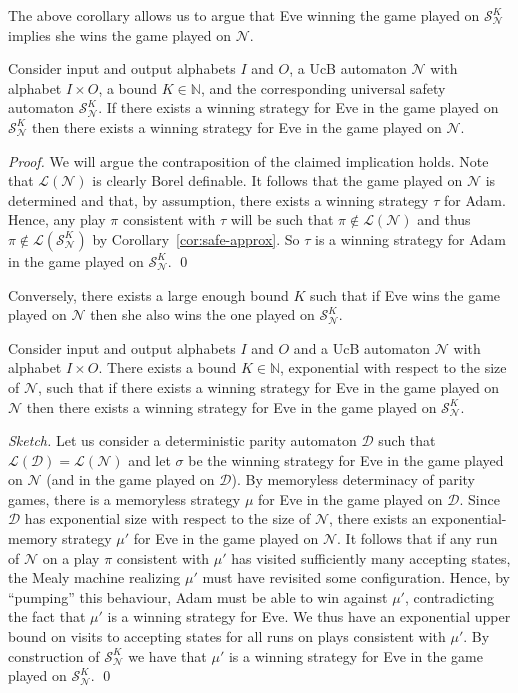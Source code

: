 \documentclass[runningheads,a4paper,draft]{llncs}
\newcommand{\eve}{Eve\xspace}
\newcommand{\adam}{Adam\xspace}
\newcommand{\calN}{\mathcal{N}}
\newcommand{\calS}{\mathcal{S}}
\newcommand{\calD}{\mathcal{D}}
\newcommand{\lang}[1]{\mathcal{L}({#1})}
\begin{document}
The above corollary allows us to argue that \eve winning the game played on
$\calS^K_\calN$ implies she wins the game played on $\calN$.
\begin{lemma}
    Consider input and output alphabets $I$ and $O$, a UcB
    automaton $\calN$ with alphabet $I \times O$, a bound $K \in \mathbb{N}$,
    and the corresponding universal safety automaton $\calS^K_\calN$. If there
    exists a winning strategy for \eve in the game played on $\calS^K_\calN$
    then there exists a winning strategy for \eve in the game played on
    $\calN$.
\end{lemma}
\begin{proof}
    We will argue the contraposition of the claimed implication holds.
    Note that $\lang{\calN}$ is clearly Borel definable. It follows that the
    game played on $\calN$ is determined and that, by assumption, there exists a
    winning strategy $\tau$ for \adam. Hence, any play $\pi$ consistent with
    $\tau$ will be such that $\pi \not\in \lang{\calN}$ and thus $\pi \not\in
    \lang{\calS^K_\calN}$ by Corollary~\ref{cor:safe-approx}.
    So $\tau$ is a winning strategy for \adam in the game
    played on $\calS^K_\calN$.
\qed\end{proof}

Conversely, there exists a large enough bound $K$ such that if \eve wins the game
played on $\calN$ then she also wins the one played on $\calS^K_\calN$.
%
\begin{lemma}
    Consider input and output alphabets $I$ and $O$ and a UcB automaton
    $\calN$ with alphabet $I \times O$. There exists a bound $K \in
    \mathbb{N}$, exponential with respect to the size of $\calN$, such that if
    there exists a winning strategy for \eve in the game played on $\calN$
    then there exists a winning strategy for \eve in the game played on
    $\calS^K_\calN$.
\end{lemma}
\begin{proof}[Sketch]
    Let us consider a deterministic parity automaton $\calD$ such that
    $\lang{\calD} = \lang{\calN}$ and let $\sigma$ be the winning strategy for
    \eve in the game played on $\calN$ (and in the game played on $\calD$). By
    memoryless determinacy of parity games, there is a memoryless strategy $\mu$
    for \eve in the game played on $\calD$. Since $\calD$ has exponential size
    with respect to the size of $\calN$, there exists an exponential-memory
    strategy $\mu'$ for \eve in the game played on $\calN$. It follows that if
    any run of $\calN$ on a play $\pi$ consistent with $\mu'$ has visited
    sufficiently many accepting states, the Mealy machine realizing $\mu'$ must
    have revisited some configuration. Hence, by ``pumping'' this behaviour,
    \adam must be able to win against $\mu'$, contradicting the fact that $\mu'$
    is a winning strategy for \eve. We thus have an exponential upper bound on
    visits to accepting states for all runs on plays consistent with $\mu'$. By
    construction of $\calS^K_\calN$ we have that $\mu'$ is a winning strategy for
    \eve in the game played on $\calS^K_\calN$.
\qed\end{proof}
\end{document}
